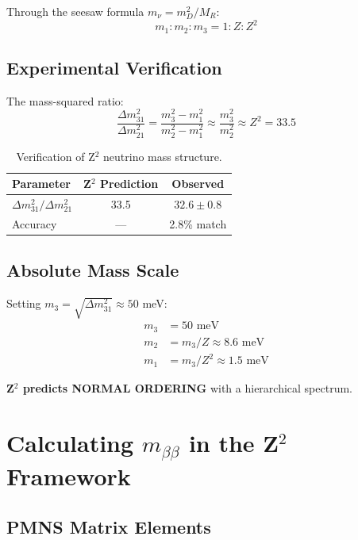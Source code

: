 \documentclass[12pt,a4paper]{article}
\begin{document}
Through the seesaw formula $m_\nu = m_D^2 / M_R$:
\begin{equation}
m_1 : m_2 : m_3 = 1 : Z : Z^2
\end{equation}

\subsection{Experimental Verification}

The mass-squared ratio:
\begin{equation}
\frac{\Delta m^2_{31}}{\Delta m^2_{21}} = \frac{m_3^2 - m_1^2}{m_2^2 - m_1^2} \approx \frac{m_3^2}{m_2^2} \approx Z^2 = 33.5
\end{equation}

\begin{table}[h]
\centering
\begin{tabular}{@{}lcc@{}}
\toprule
Parameter & Z$^2$ Prediction & Observed \\
\midrule
$\Delta m^2_{31}/\Delta m^2_{21}$ & 33.5 & $32.6 \pm 0.8$ \\
Accuracy & --- & 2.8\% match \\
\bottomrule
\end{tabular}
\caption{Verification of Z$^2$ neutrino mass structure.}
\end{table}

\subsection{Absolute Mass Scale}

Setting $m_3 = \sqrt{\Delta m^2_{31}} \approx 50$ meV:
\begin{align}
m_3 &= 50 \text{ meV} \\
m_2 &= m_3 / Z \approx 8.6 \text{ meV} \\
m_1 &= m_3 / Z^2 \approx 1.5 \text{ meV}
\end{align}

\textbf{Z$^2$ predicts NORMAL ORDERING} with a hierarchical spectrum.

\section{Calculating $m_{\beta\beta}$ in the Z$^2$ Framework}

\subsection{PMNS Matrix Elements}
\end{document}
